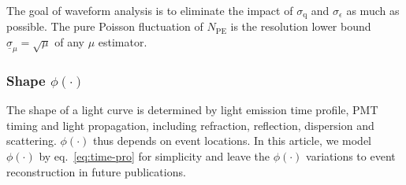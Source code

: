 The goal of waveform analysis is to eliminate the impact of $\sigma_\mathrm{q}$ and $\sigma_\epsilon$ as much as possible.  The pure Poisson fluctuation of $N_\mathrm{PE}$ is the resolution lower bound $\underline{\sigma}_\mu = \sqrt{\mu}$ of any $\mu$ estimator.

\subsubsection{Shape $\phi(\cdot)$}
\label{sec:shape-phicdot}

The shape of a light curve is determined by light emission time profile, PMT timing and light propagation, including refraction, reflection, dispersion and scattering.  $\phi(\cdot)$ thus depends on event locations.  In this article, we model $\phi(\cdot)$ by eq.~\eqref{eq:time-pro} for simplicity and leave the $\phi(\cdot)$ variations to event reconstruction in future publications.
